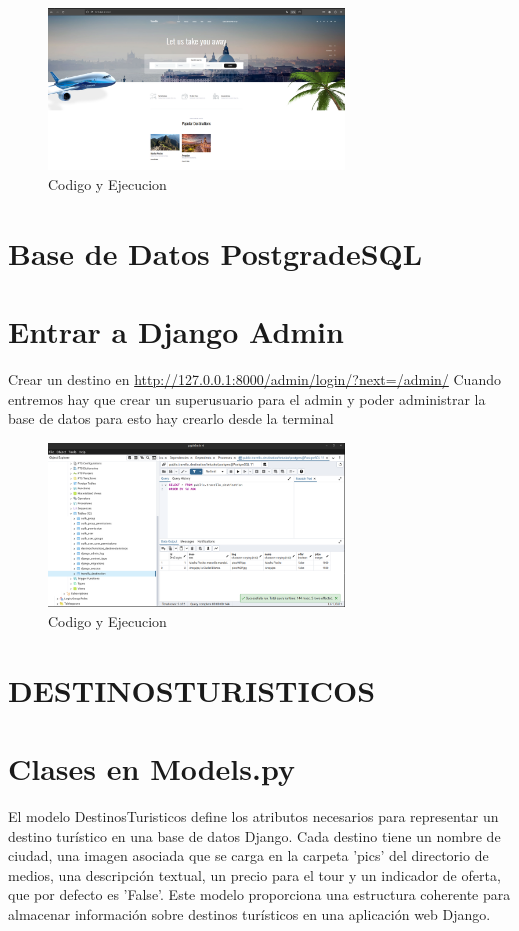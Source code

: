 \documentclass[10pt, a4paper]{article}
\begin{document}
\begin{figure}[H]
  \centering
  \includegraphics[width=0.7\textwidth]{img/index.png}
  \caption{Codigo y Ejecucion}
\end{figure}

\section{Base de Datos PostgradeSQL}

\section{Entrar a Django Admin}
Crear un destino en \href{http://127.0.0.1:8000/admin/login/?next=/admin/}{http://127.0.0.1:8000/admin/login/?next=/admin/}
\singlespacing
Cuando entremos hay que crear un superusuario para el admin y poder administrar la base de datos para esto hay crearlo desde la terminal

\begin{figure}[H]
  \centering
  \includegraphics[width=0.7\textwidth]{img/travello-db.png}
  \caption{Codigo y Ejecucion}
\end{figure}

\section{DESTINOSTURISTICOS}

\section{Clases en Models.py}
El modelo DestinosTuristicos define los atributos necesarios para representar un destino turístico en una base de datos Django. Cada destino tiene un nombre de ciudad, una imagen asociada que se carga en la carpeta 'pics' del directorio de medios, una descripción textual, un precio para el tour y un indicador de oferta, que por defecto es 'False'. Este modelo proporciona una estructura coherente para almacenar información sobre destinos turísticos en una aplicación web Django.
\end{document}
